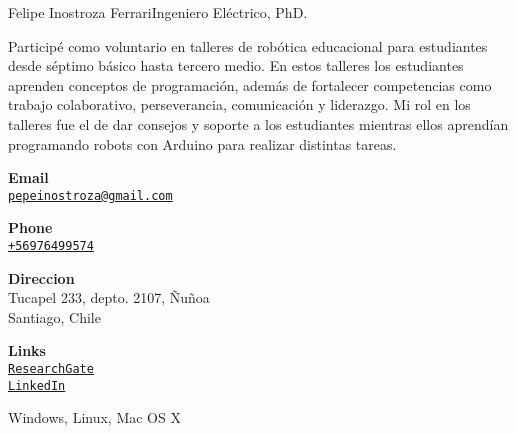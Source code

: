 \documentclass{article}
\begin{document}
\begin{cv}[avatar]{Felipe Inostroza Ferrari}{Ingeniero Eléctrico, PhD.}
	\begin{cvevent}[2015][2017]
		Participé como voluntario en talleres de robótica educacional para estudiantes desde séptimo básico hasta tercero medio.
		En estos talleres los estudiantes aprenden conceptos de programación, además de fortalecer competencias como trabajo colaborativo, perseverancia, comunicación y liderazgo. Mi rol en los talleres fue el de dar consejos y soporte a los estudiantes mientras ellos aprendían programando robots con Arduino para realizar distintas tareas.
	\end{cvevent}


	



	\cvsidebar %



	\begin{cvitem}[Envelope][4]
		\textbf{Email}\\
		\href{mailto:pepeinostroza@gmail.com}{\texttt{pepeinostroza@gmail.com}}
	\end{cvitem}

	\cvseparator[3]
	\begin{cvitem}[Phone][4]
		\textbf{Phone}\\
		\href{tel:+56976499574}{\texttt{+56976499574}}
	\end{cvitem}

	\cvseparator[3]
	\begin{cvitem}[Home][4]
		\textbf{Direccion}\\
		Tucapel 233, depto. 2107, Ñuñoa\\ Santiago, Chile
	\end{cvitem}

	\cvseparator[3]
	\begin{cvitem}[Globe][4]
		\textbf{Links}\\
		\href{https://www.researchgate.net/profile/Felipe-Inostroza-4}{\texttt{ResearchGate}} \\
		\href{https://www.linkedin.com/in/felipe-inostroza-ferrari-a0852035/}{\texttt{LinkedIn}}
	\end{cvitem}


	\cvseparator
	\begin{cvitem}
		Windows, Linux, Mac OS X
	\end{cvitem}


\end{cv}
\end{document}
